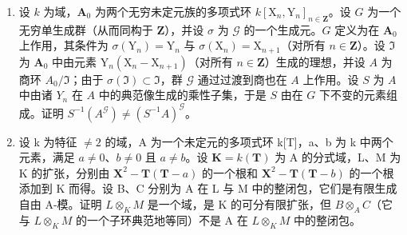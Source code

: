 \begin{enumerate}
\def\labelenumi{\arabic{enumi}.}
\setcounter{enumi}{27}
\item
  设 \(k\) 为域，\(\mathbf{A}_0\) 为两个无穷未定元族的多项式环 \(k[\mathrm{X}_n, \mathrm{Y}_n]_{n \in \mathbf{Z}}\)。设 \(G\) 为一个无穷单生成群（从而同构于 \(\mathbf{Z}\)），并设 \(\sigma\) 为 \(\mathcal{G}\) 的一个生成元。\(G\) 定义为在 \(\mathbf{A}_0\) 上作用，其条件为 \(\sigma(\mathrm{Y}_n) = \mathrm{Y}_n\) 与 \(\sigma(\mathrm{X}_n) = \mathrm{X}_{n+1}\)（对所有 \(n \in \mathbf{Z}\)）。设 \(\Im\) 为 \(\mathbf{A}_0\) 中由元素 \(\mathrm{Y}_n(\mathrm{X}_n - \mathrm{X}_{n+1})\)（对所有 \(n \in \mathbf{Z}\)）生成的理想，并设 \(A\) 为商环 \(A_0 / \Im\)；由于 \(\sigma(\Im) \subset \Im\)，群 \(\mathcal{G}\) 通过过渡到商也在 \(A\) 上作用。设 \(S\) 为 \(A\) 中由诸 \(Y_n\) 在 \(A\) 中的典范像生成的乘性子集，于是 \(S\) 由在 \(G\) 下不变的元素组成。证明 \(S^{-1}(A^{\mathcal{G}}) \neq (S^{-1}A)^{\mathcal{G}}\)。
\item
  设 k 为特征 \(\neq2\) 的域，A 为一个未定元的多项式环 k{[}T{]}，a、b 为 k 中两个元素，满足 \(a\neq0\)、\(b\neq0\) 且 \(a\neq b\)。设 \(\mathbf{K}=k(\mathbf{T})\) 为 A 的分式域，L、M 为 K 的扩张，分别由 \(\mathbf{X}^{2}-\mathbf{T}(\mathbf{T}-a)\) 的一个根和 \(\mathbf{X}^{2}-\mathbf{T}(\mathbf{T}-b)\) 的一个根添加到 K 而得。设 B、C 分别为 A 在 L 与 M 中的整闭包，它们是有限生成自由 A-模。证明 \(L\otimes_{K}M\) 是一个域，是 K 的可分有限扩张，但 \(B\otimes_{A}C\)（它与 \(L\otimes_{K}M\) 的一个子环典范地等同）不是 A 在 \(L\otimes_{K}M\) 中的整闭包。
\end{enumerate}
\relax{}
